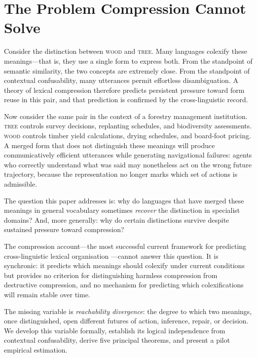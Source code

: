\documentclass[12pt]{article}
\theoremstyle{rthm}
\theoremstyle{rdef}
\theoremstyle{remark}
\begin{document}
\newpage
\setcounter{page}{1}
\tableofcontents
\newpage

\section{The Problem Compression Cannot Solve}
\label{sec:problem}

Consider the distinction between \textsc{wood} and \textsc{tree}. Many languages
colexify these meanings---that is, they use a single form to express both. From
the standpoint of semantic similarity, the two concepts are extremely close.
From the standpoint of contextual confusability, many utterances permit
effortless disambiguation. A theory of lexical compression therefore predicts
persistent pressure toward form reuse in this pair, and that prediction is
confirmed by the cross-linguistic record.

Now consider the same pair in the context of a forestry management
institution. \textsc{tree} controls survey decisions, replanting schedules, and
biodiversity assessments. \textsc{wood} controls timber yield calculations,
drying schedules, and board-foot pricing. A merged form that does not distinguish
these meanings will produce communicatively efficient utterances while generating
navigational failures: agents who correctly understand what was said may
nonetheless act on the wrong future trajectory, because the representation no
longer marks which set of actions is admissible.

The question this paper addresses is: why do languages that have merged these
meanings in general vocabulary sometimes \emph{recover} the distinction in
specialist domains? And, more generally: why do certain distinctions survive
despite sustained pressure toward compression?

The compression account---the most successful current framework for predicting
cross-linguistic lexical organisation \cite{brochhagen2022,brochhagen2026}---cannot
answer this question. It is synchronic: it predicts which meanings should
colexify under current conditions but provides no criterion for distinguishing
harmless compression from destructive compression, and no mechanism for
predicting which colexifications will remain stable over time.

The missing variable is \emph{reachability divergence}: the degree to which two
meanings, once distinguished, open different futures of action, inference,
repair, or decision. We develop this variable formally, establish its logical
independence from contextual confusability, derive five principal theorems, and
present a pilot empirical estimation.
\end{document}
